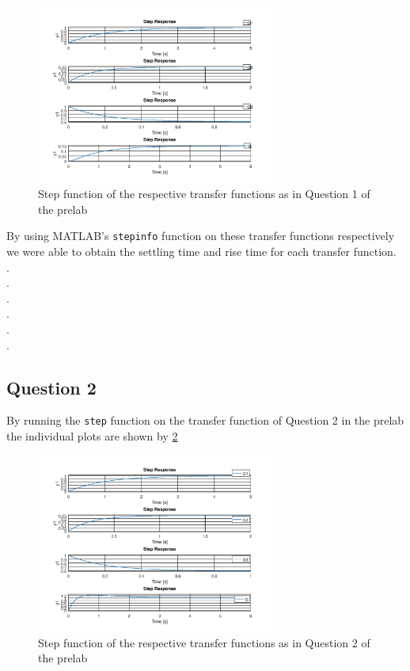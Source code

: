 \documentclass[12pt, a4paper]{article}
\begin{document}
		\begin{figure}[H]
			\centering
			\includegraphics[width=0.7\textwidth]{Images/question_1_lab.png}
			\caption{Step function of the respective transfer functions as in Question 1 of the prelab}
			\label{fig:question_1_lab} 
		\end{figure}
		
		By using MATLAB's \texttt{stepinfo} function on these transfer functions respectively we were able to obtain the  settling time and rise time for each transfer function. \\
		.\\
		.\\
		.\\
		.\\
		.\\
		.\\

		\subsection{Question 2} %
		\label{sub:question_2}
		By running the \texttt{step} function on the transfer function of Question 2 in the prelab the individual plots are shown by \ref{fig:question_2_lab}

		\begin{figure}[H]
			\centering
			\includegraphics[width=0.7\textwidth]{Images/question_2_lab.png}
			\caption{Step function of the respective transfer functions as in Question 2 of the prelab}
			\label{fig:question_2_lab} 
		\end{figure}
\end{document}
